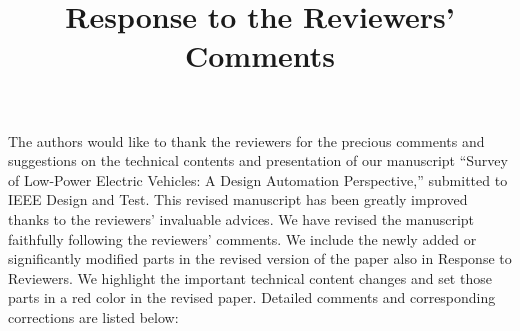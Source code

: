 \documentclass[onecolumn]{IEEEconf}
\title{Response to the Reviewers' Comments}
\begin{document}
\maketitle

The authors would like to thank the reviewers for the precious comments and suggestions on the technical contents and presentation of our manuscript ``Survey of Low-Power Electric Vehicles: A Design Automation Perspective,'' submitted to IEEE Design and Test. This revised manuscript has been greatly improved thanks to the reviewers’ invaluable advices. We have revised the manuscript faithfully following the reviewers’ comments. We include the newly added or significantly modified parts in the revised version of the paper also in Response to Reviewers. We highlight the important technical content changes and set those parts in a red color in the revised paper. Detailed comments and corresponding corrections are listed below:\\
\end{document}
